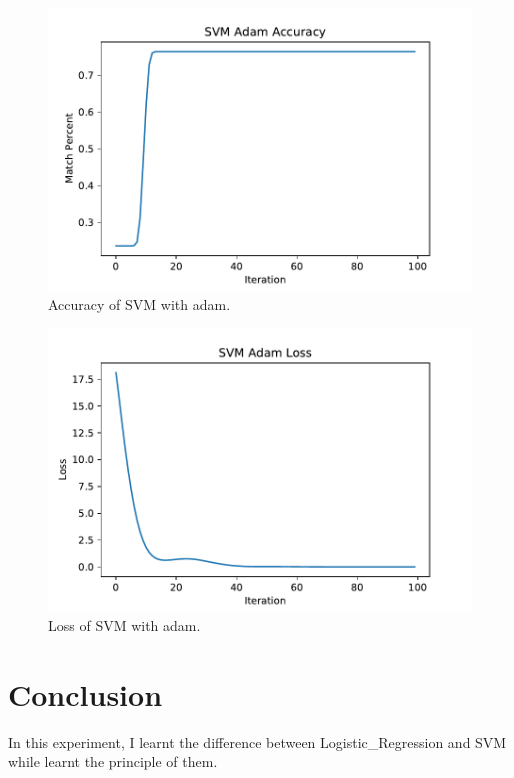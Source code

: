 \documentclass[journal, a4paper]{IEEEtran}
\begin{document}
	\begin{figure}[!hbt]
		\begin{center}
		\includegraphics[width=\columnwidth]{lab2_svm_adam_acc}
		\caption{Accuracy of SVM with adam.}
		\end{center}
	\end{figure}
	\begin{figure}[!hbt]
		\centering
		\includegraphics[width=\columnwidth]{lab2_svm_adam_loss}
		\caption{Loss of SVM with adam.}
	\end{figure}


\section{Conclusion}
	In this experiment, I learnt the difference between  Logistic\_Regression and SVM while learnt the principle of them.



\end{document}
